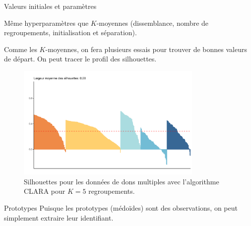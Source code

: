 \documentclass[
  ignorenonframetext,
]{beamer}
\newenvironment{Shaded}{\begin{snugshade}}{\end{snugshade}}
\newcommand{\CommentTok}[1]{\textcolor[rgb]{0.37,0.37,0.37}{#1}}
\newcommand{\NormalTok}[1]{\textcolor[rgb]{0.00,0.23,0.31}{#1}}
\newcommand{\OtherTok}[1]{\textcolor[rgb]{0.00,0.23,0.31}{#1}}
\newcommand{\SpecialCharTok}[1]{\textcolor[rgb]{0.37,0.37,0.37}{#1}}
\begin{document}
\begin{frame}{Valeurs initiales et paramètres}
\protect\hypertarget{valeurs-initiales-et-paramuxe8tres}{}
\footnotesize

Même hyperparamètres que \(K\)-moyennes (dissemblance, nombre de
regroupements, initialisation et séparation).

Comme les \(K\)-moyennes, on fera plusieurs essais pour trouver de
bonnes valeurs de départ. On peut tracer le profil des silhouettes.

\begin{figure}

{\centering \includegraphics[width=0.8\textwidth,height=\textheight]{MATH60602-diapos12_files/figure-beamer/fig-clarasilhouette-1.pdf}

}

\caption{\label{fig-clarasilhouette}Silhouettes pour les données de dons
multiples avec l'algorithme CLARA pour \(K=5\) regroupements.}

\end{figure}
\end{frame}

\begin{frame}[fragile]{Prototypes}
\protect\hypertarget{prototypes}{}
Puisque les prototypes (médoïdes) sont des observations, on peut
simplement extraire leur identifiant.

\begin{Shaded}
\end{Shaded}
\end{frame}
\end{document}
